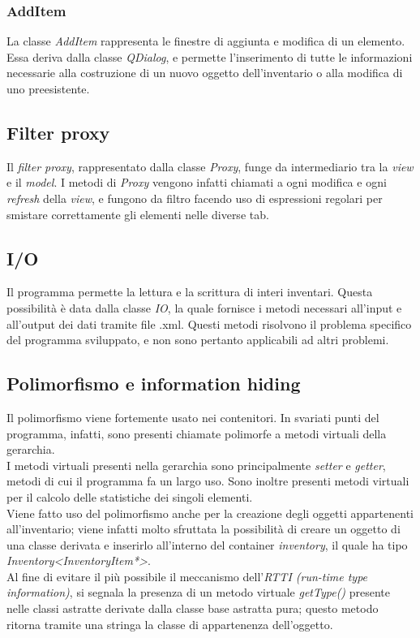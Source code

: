 \subsubsection{AddItem}
La classe \textit{AddItem} rappresenta le finestre di aggiunta e modifica di un elemento. Essa deriva dalla classe \textit{QDialog}, e permette l'inserimento di tutte le informazioni necessarie alla costruzione di un nuovo oggetto dell'inventario o alla modifica di uno preesistente.

\subsection{Filter proxy}
Il \textit{filter proxy}, rappresentato dalla classe \textit{Proxy}, funge da intermediario tra la \textit{view} e il \textit{model}. I metodi di \textit{Proxy} vengono infatti chiamati a ogni modifica e ogni \textit{refresh} della \textit{view}, e fungono da filtro facendo uso di espressioni regolari per smistare correttamente gli elementi nelle diverse tab.

\subsection{I/O}
Il programma permette la lettura e la scrittura di interi inventari. Questa possibilità è data dalla classe \textit{IO}, la quale fornisce i metodi necessari all'input e all'output dei dati tramite file .xml. Questi metodi risolvono il problema specifico del programma sviluppato, e non sono pertanto applicabili ad altri problemi.

\subsection{Polimorfismo e information hiding}
Il polimorfismo viene fortemente usato nei contenitori. In svariati punti del programma, infatti, sono presenti chiamate polimorfe a metodi virtuali della gerarchia. \\
I metodi virtuali presenti nella gerarchia sono principalmente \textit{setter} e \textit{getter}, metodi di cui il programma fa un largo uso. Sono inoltre presenti metodi virtuali per il calcolo delle statistiche dei singoli elementi. \\
Viene fatto uso del polimorfismo anche per la creazione degli oggetti appartenenti all'inventario; viene infatti molto sfruttata la possibilità di creare un oggetto di una classe derivata e inserirlo all'interno del container \textit{inventory}, il quale ha tipo \textit{Inventory<InventoryItem*>}. \\
Al fine di evitare il più possibile il meccanismo dell'\textit{RTTI (run-time type information)}, si segnala la presenza di un metodo virtuale \textit{getType()} presente nelle classi astratte derivate dalla classe base astratta pura; questo metodo ritorna tramite una stringa la classe di appartenenza dell'oggetto.

